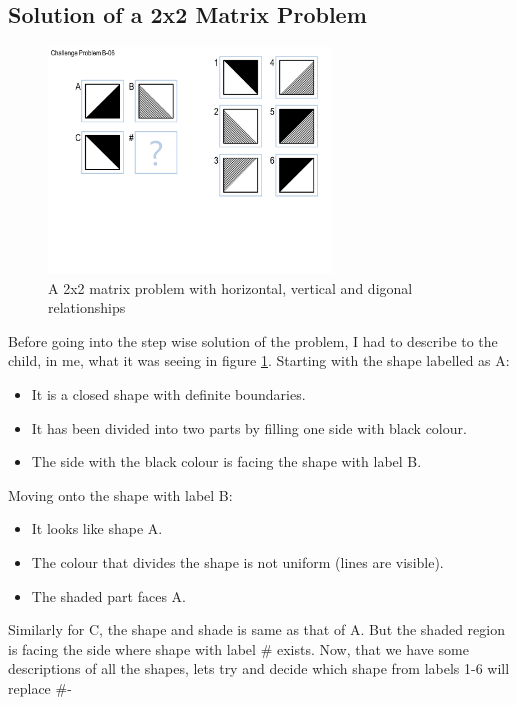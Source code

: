 \documentclass[
	letterpaper, %
]{jdf}
\begin{document}
\subsection{Solution of a 2x2 Matrix Problem} %
\begin{figure}[h]
	\centering
	\includegraphics[height=6cm]{Figures/Challenge_Problem_B-06.PNG}
	\caption{A 2x2 matrix problem with horizontal, vertical and digonal relationships}
	\label{fig:problem_2x2}
\end{figure}
Before going into the step wise solution of the problem, I had to describe to the child, in me, what it was seeing in figure \ref{fig:problem_2x2}. Starting with the shape labelled as A:
\begin{itemize}
	\item It is a closed shape with definite boundaries.
	\item It has been divided into two parts by filling one side with black colour.
	\item The side with the black colour is facing the shape with label B.
\end{itemize}
Moving onto the shape with label B:
\begin{itemize}
	\item It looks like shape A.
	\item The colour that divides the shape is not uniform (lines are visible).
	\item The shaded part faces A.
\end{itemize}
Similarly for C, the shape and shade is same as that of A. But the shaded region is facing the side where shape with label \# exists. Now, that we have some descriptions of all the shapes, lets try and decide which shape from labels 1-6 will replace \#-
\end{document}
